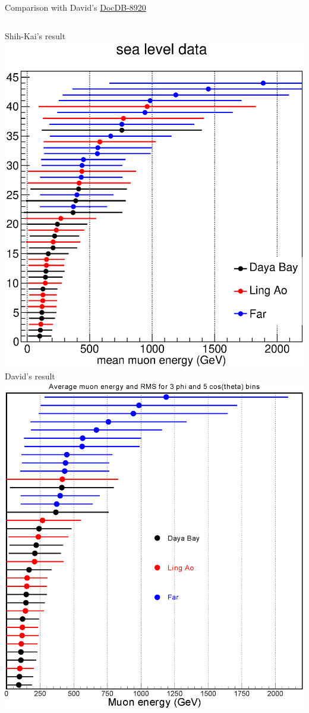 \documentclass{beamer}
\begin{document}
\begin{frame}{Comparison with David's \href{http://dayabay.ihep.ac.cn/cgi-bin/DocDB/ShowDocument?docid=8920}{DocDB-8920}}
	\begin{columns}[c]
			\centering
			Shih-Kai's result
			\includegraphics[height=\textwidth]{CompDavid_sea.eps}
			\centering
			David's result
			\includegraphics[height=\textwidth]{David_mean_energy.eps}
	\end{columns}
\end{frame}
\end{document}
